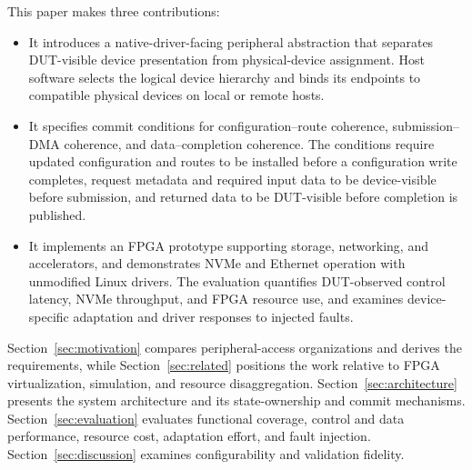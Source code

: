 This paper makes three contributions:
\begin{itemize}[leftmargin=*]
    \item It introduces a native-driver-facing peripheral abstraction that
    separates DUT-visible device presentation from physical-device assignment.
    Host software selects the
    logical device hierarchy and binds its endpoints to compatible physical
    devices on local or remote hosts.

    \item It specifies commit conditions for configuration--route coherence,
    submission--DMA coherence, and data--completion coherence. The conditions
    require updated configuration and routes to be installed before a
    configuration write completes, request metadata and required input data
    to be device-visible before submission, and returned data to be DUT-visible
    before completion is published.

    \item It implements an FPGA prototype supporting storage, networking,
    and accelerators, and demonstrates NVMe and Ethernet operation with
    unmodified Linux drivers. The evaluation quantifies DUT-observed control
    latency, NVMe throughput, and FPGA resource use, and examines
    device-specific adaptation and driver responses to injected faults.
\end{itemize}

Section~\ref{sec:motivation} compares peripheral-access
organizations and derives the requirements, while Section~\ref{sec:related}
positions the work relative to FPGA virtualization, simulation, and resource
disaggregation. Section~\ref{sec:architecture} presents the system
architecture and its state-ownership and commit mechanisms.
Section~\ref{sec:evaluation} evaluates functional coverage, control and
data performance, resource cost, adaptation effort, and fault injection.
Section~\ref{sec:discussion} examines configurability and validation fidelity.
